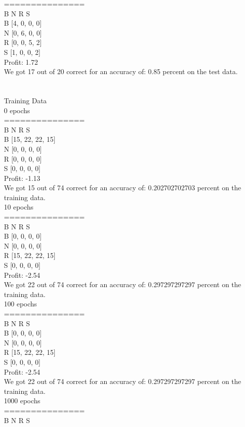 \documentclass{book}
\begin{document}
===============
\\
   B  N  R  S
\\
B [4, 0, 0, 0]
\\
N [0, 6, 0, 0]
\\
R [0, 0, 5, 2]
\\
S [1, 0, 0, 2]
\\
Profit: 1.72
\\
We got 17 out of 20 correct for an accuracy of: 0.85 percent on the test data.\\\\\\
Training Data
\\
0 epochs
\\
===============
\\
   B  N  R  S
\\
B [15, 22, 22, 15]
\\
N [0, 0, 0, 0]
\\
R [0, 0, 0, 0]
\\
S [0, 0, 0, 0]
\\
Profit: -1.13
\\
We got 15 out of 74 correct for an accuracy of: 0.202702702703 percent on the training data.
\\
10 epochs
\\
===============
\\
   B  N  R  S
\\
B [0, 0, 0, 0]
\\
N [0, 0, 0, 0]
\\
R [15, 22, 22, 15]
\\
S [0, 0, 0, 0]
\\
Profit: -2.54
\\
We got 22 out of 74 correct for an accuracy of: 0.297297297297 percent on the training data.
\\
100 epochs
\\
===============
\\
   B  N  R  S
\\
B [0, 0, 0, 0]
\\
N [0, 0, 0, 0]
\\
R [15, 22, 22, 15]
\\
S [0, 0, 0, 0]
\\
Profit: -2.54
\\
We got 22 out of 74 correct for an accuracy of: 0.297297297297 percent on the training data.
\\
1000 epochs
\\
===============
\\
   B  N  R  S
\\
\end{document}
